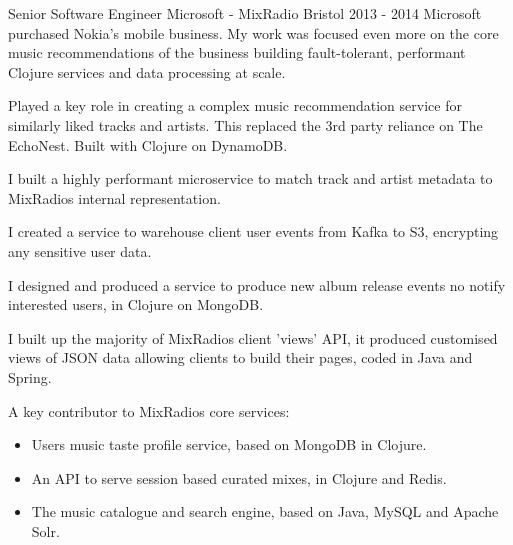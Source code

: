 \begin{cventries}
  \cventrypara
  {Senior Software Engineer} %
  {Microsoft - MixRadio} %
  {Bristol} %
  {2013  - 2014} %
  {Microsoft purchased Nokia's mobile business. My work was focused even more on the core music recommendations of
  the business building fault-tolerant, performant Clojure services and data processing at scale.}
  {
    \begin{cvitems} %
      \item {Played a key role in creating a complex music recommendation service for similarly liked tracks and artists.
      This replaced the 3rd party reliance on The EchoNest. Built with Clojure on DynamoDB.}
      \item {I built a highly performant microservice to match track and artist metadata to MixRadios internal representation.}
      \item {I created a service to warehouse client user events from Kafka to S3, encrypting any sensitive user data.}
      \item {I designed and produced a service to produce new album release events no notify interested users,
        in Clojure on MongoDB.}
      \item {I built up the majority of MixRadios client ’views’ API, it produced customised views of JSON data
      allowing clients to build their pages, coded in Java and Spring.}
      \item {A key contributor to MixRadios core services:
        \begin{itemize}
          \item Users music taste profile service, based on MongoDB in Clojure.
          \item An API to serve session based curated mixes, in Clojure and Redis.
          \item The music catalogue and search engine, based on Java, MySQL and Apache Solr.
        \end{itemize}}
    \end{cvitems}
  }


\end{cventries}
